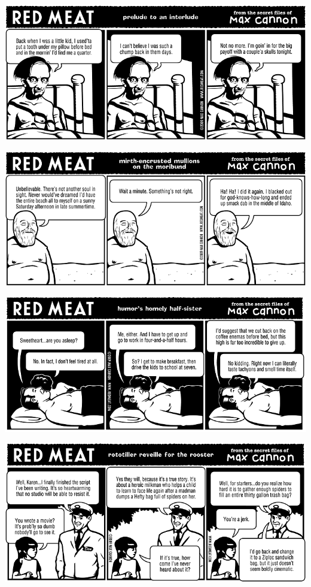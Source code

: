 \documentclass[a4paper,twoside,11pt]{article}
\begin{document}
\includegraphics[width=\textwidth]{redmeat_2009-07-28.png}



\includegraphics[width=\textwidth]{redmeat_2009-08-04.png}



\includegraphics[width=\textwidth]{redmeat_2009-08-11.png}



\includegraphics[width=\textwidth]{redmeat_2009-08-18.png}
\end{document}
